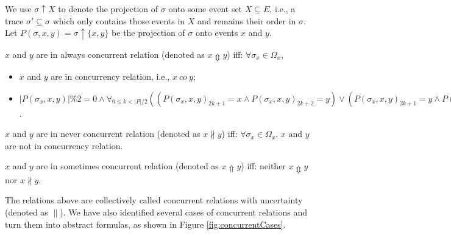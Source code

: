 \documentclass[dvips,...]{llncs}
\begin{document}
We use $\sigma\uparrow X$ to denote the projection of $\sigma$ onto some event set $X\subseteq E$, i.e., a trace $\sigma'\subseteq\sigma$ which only contains those events in $X$ and remains their order in $\sigma$. Let $P(\sigma,x,y)=\sigma\uparrow\{x,y\}$ be the projection of $\sigma$ onto events $x$ and $y$.

\begin{definition}\label{def:alwaysConcurrent}
$x$ and $y$ are in always concurrent relation (denoted as $x\Updownarrow y$) iff: $\forall\sigma_{x}\in\Omega_{x}$,
	\begin{itemize}
		\item[-] $x$ and $y$ are in concurrency relation, i.e., $x~co~y$;
		\item[-] $|P(\sigma_{x},x,y)|\%2=0\wedge\forall_{0\leq k<|P|/2}((P(\sigma_{x},x,y)_{2k+1}=x\wedge P(\sigma_{x},x,y)_{2k+2}=y)\vee(P(\sigma_{x},x,y)_{2k+1}=y\wedge P(\sigma_{x},x,y)_{2k+2}=x)\vee(P(\sigma_{x},x,y)_{2k+1}=y\wedge P(\sigma_{x},x,y)_{2k+2}=y))$.
	\end{itemize}
\end{definition}

\begin{definition}\label{def:neverConcurrent}
$x$ and $y$ are in never concurrent relation (denoted as $x\nparallel y$) iff: $\forall\sigma_{x}\in\Omega_{x}$, $x$ and $y$ are not in concurrency relation.
\end{definition}

\begin{definition}\label{def:sometimesConcurrent}
$x$ and $y$ are in sometimes concurrent relation (denoted as $x\Uparrow y$) iff: neither $x\Updownarrow y$ nor $x\nparallel y$.
\end{definition}

The relations above are collectively called concurrent relations with uncertainty (denoted as $\parallel$). We have also identified several cases of concurrent relations and turn them into abstract formulas, as shown in Figure \ref{fig:concurrentCases}.
\end{document}
